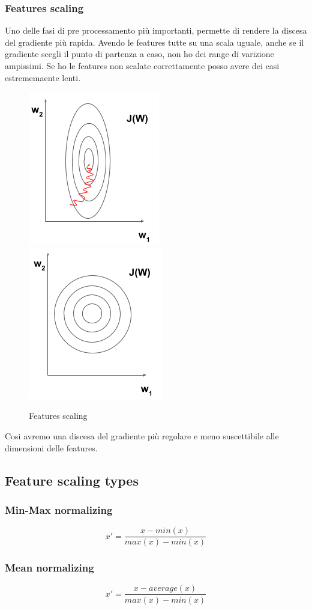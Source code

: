 \subsubsection{Features scaling}
Uno delle fasi di pre processamento più importanti, permette di rendere la discesa del gradiente
più rapida.
Avendo le features tutte su una scala uguale, anche se il gradiente scegli
il punto di partenza a caso, non ho dei range di varizione ampissimi.
Se ho le features non scalate correttamente posso avere dei casi estrememaente lenti.


\begin{figure}[H]
    \centering
    \includegraphics[width=0.3\linewidth]{imgs/featues-scaling-1}
    \includegraphics[width=0.3\linewidth]{imgs/scaling-2}
    \caption{Features scaling}
    \label{fig:scaling1}
\end{figure}

Cosi avremo una discesa del gradiente più regolare e meno suscettibile alle dimensioni
delle features.

\subsection{Feature scaling types}
\subsubsection{Min-Max normalizing}
\begin{equation}
    x' = \frac{x - min(x)}{max(x)-min(x)}
\end{equation}


\subsubsection{Mean normalizing}
\begin{equation}
    x'=\frac{x - average(x)}{max(x)-min(x)}
\end{equation}
